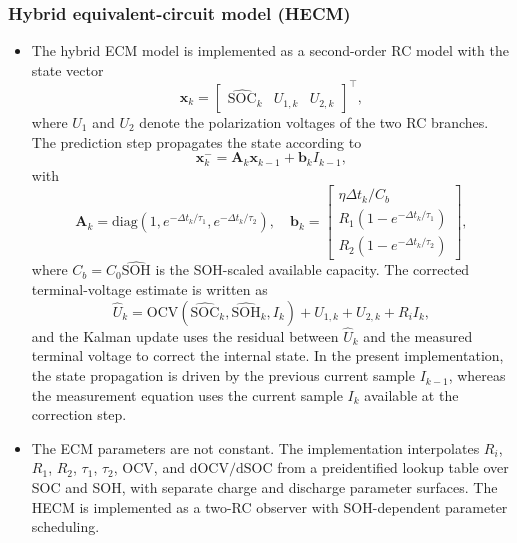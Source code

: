 \documentclass[review,nopreprintline]{elsarticle}
\begin{document}
\subsubsection{Hybrid equivalent-circuit model (HECM)}
\begin{itemize}[leftmargin=*]
    \item The hybrid ECM model is implemented as a second-order RC model with the state vector
    \begin{equation}
        \mathbf{x}_k = \begin{bmatrix}\widehat{\mathrm{SOC}}_k & U_{1,k} & U_{2,k}\end{bmatrix}^{\top},
        \label{eq:ecm_state}
    \end{equation}
    where $U_1$ and $U_2$ denote the polarization voltages of the two RC branches. The prediction step propagates the state according to
    \begin{equation}
        \mathbf{x}_{k}^{-}=\mathbf{A}_k \mathbf{x}_{k-1}+\mathbf{b}_k I_{k-1},
        \label{eq:ecm_prediction}
    \end{equation}
    with
    \begin{equation}
        \mathbf{A}_k=\mathrm{diag}\!\left(1,e^{-\Delta t_k/\tau_1},e^{-\Delta t_k/\tau_2}\right),
        \quad
        \mathbf{b}_k=
        \begin{bmatrix}
            \eta \Delta t_k / C_b \\
            R_1\!\left(1-e^{-\Delta t_k/\tau_1}\right) \\
            R_2\!\left(1-e^{-\Delta t_k/\tau_2}\right)
        \end{bmatrix},
        \label{eq:ecm_ab}
    \end{equation}
    where $C_b=C_0 \widehat{\mathrm{SOH}}$ is the SOH-scaled available capacity. The corrected terminal-voltage estimate is written as
    \begin{equation}
        \widehat{U}_k = \mathrm{OCV}(\widehat{\mathrm{SOC}}_k,\widehat{\mathrm{SOH}}_k,I_k) + U_{1,k} + U_{2,k} + R_i I_k,
        \label{eq:ecm_voltage}
    \end{equation}
    and the Kalman update uses the residual between $\widehat{U}_k$ and the measured terminal voltage to correct the internal state. In the present implementation, the state propagation is driven by the previous current sample $I_{k-1}$, whereas the measurement equation uses the current sample $I_k$ available at the correction step.
    \item The ECM parameters are not constant. The implementation interpolates $R_i$, $R_1$, $R_2$, $\tau_1$, $\tau_2$, $\mathrm{OCV}$, and $\mathrm{dOCV}/\mathrm{dSOC}$ from a preidentified lookup table over SOC and SOH, with separate charge and discharge parameter surfaces. The HECM is implemented as a two-RC observer with SOH-dependent parameter scheduling.
\end{itemize}
\end{document}
